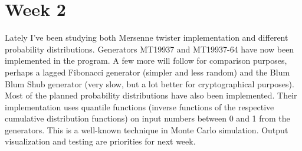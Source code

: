 \documentclass[reprint,aip]{revtex4-1}
\begin{document}
\section{Week 2}

Lately I've been studying both Mersenne twister implementation and different probability distributions. Generators MT19937 and MT19937-64 have now been implemented in the program. A few more will follow for comparison purposes, perhaps a lagged Fibonacci generator (simpler and less random) and the Blum Blum Shub generator (very slow, but a lot better for cryptographical purposes). Most of the planned probability distributions have also been implemented. Their implementation uses quantile functions (inverse functions of the respective cumulative distribution functions) on input numbers between 0 and 1 from the generators. This is a well-known technique in Monte Carlo simulation. Output visualization and testing are priorities for next week.
\end{document}
